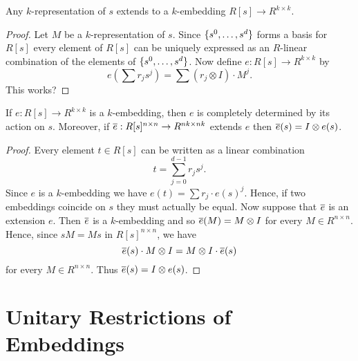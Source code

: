 \documentclass{article}
\begin{document}
\begin{proposition}
  Any $k$-representation of $s$ extends to a $k$-embedding $R[s]\to
  R^{k\times k}$.
\end{proposition}

\begin{proof}
  Let $M$ be a $k$-representation of $s$. Since $\{s^0, \ldots, s^d\}$
  forms a basis for $R[s]$ every element of $R[s]$ can be uniquely
  expressed as an $R$-linear combination of the elements of $\{s^0,
    \ldots, s^d\}$. Now define $e:R[s]\to R^{k\times k}$ by
  \[
  e \left( \sum r_j s^j \right) = \sum (r_j \otimes I) \cdot
  M^j.
  \]
  This works?
\end{proof}

\begin{proposition}
  If $e:R[s] \to R^{k\times k}$ is a
  $k$-embedding, then $e$ is completely determined by its action on
  $s$. Moreover, if $\overline{e} :R[s]^{n\times n} \to R^{nk\times
    nk}$ extends $e$ then $\overline{e} (s) = I\otimes e(s)$.
\end{proposition}

\begin{proof}
  Every element $t\in R[s]$ can be written as a linear combination
  \[
  t = \sum_{j=0}^{d-1} r_j s^j.
  \]
  Since $e$ is a $k$-embedding we have $e(t) = \sum r_j \cdot
  e(s)^j$. Hence, if two embeddings coincide on $s$ they must actually
  be equal. Now suppose that $\overline{e} $ is an extension $e$. Then $\overline{e}$
  is a $k$-embedding and so $\overline{e} (M) = M\otimes I$ for every $M\in
  R^{n\times n}$. Hence, since $s M = Ms$ in $R[s]^{n\times n}$, we
  have
  \[
  \overline{e}(s) \cdot M\otimes I = M\otimes I \cdot \overline{e}(s)
  \]
  for every $M\in R^{n\times n}$. Thus $\overline{e}(s) = I\otimes e(s)$.
\end{proof}

\section{Unitary Restrictions of Embeddings}
\end{document}
